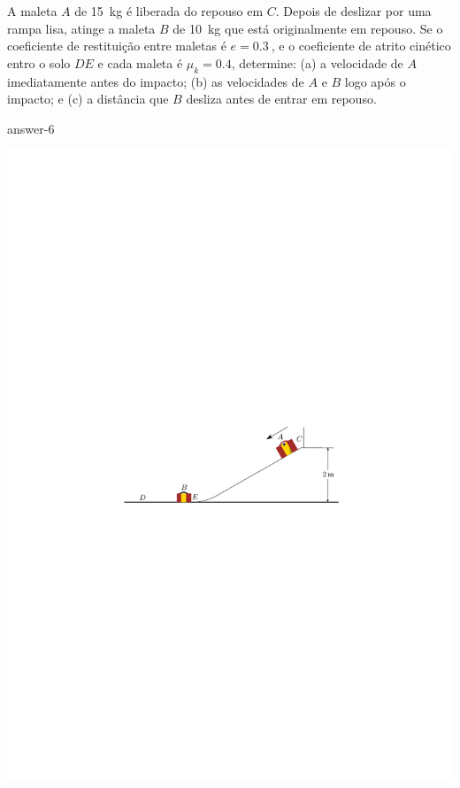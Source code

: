 \item A maleta $A$ de \SI{15}{\kilogram} é liberada do repouso em $C$. Depois de deslizar por uma rampa lisa, atinge a maleta $B$ de \SI{10}{\kilogram} que está originalmente em repouso. Se o coeficiente de restituição entre maletas é $e=\SI{0.3}{}$, e o coeficiente de atrito cinético entro o solo $DE$ e cada maleta é $\mu_{k}=0.4$, determine: (a) a velocidade de $A$ imediatamente antes do impacto; (b) as velocidades de $A$ e $B$ logo após o impacto; e (c) a distância que $B$ desliza antes de entrar em repouso.

{answer-6}

\vspace{-3.4cm}
\begin{flushright}
	\includegraphics[scale=1.3]{images/draw_10}
\end{flushright}